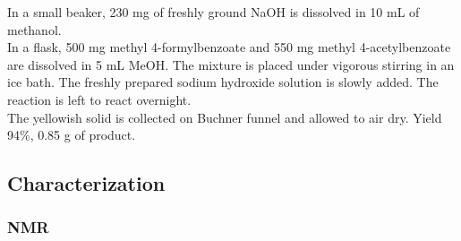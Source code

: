 \documentclass[../Master.tex]{subfiles}
\begin{document}
In a small beaker, 230 mg of freshly ground NaOH is dissolved in 10 mL of methanol. \\
In a flask, 500 mg methyl 4-formylbenzoate and 550 mg methyl 4-acetylbenzoate are dissolved in 5 mL MeOH. The mixture is placed under vigorous stirring in an ice bath. The freshly prepared sodium hydroxide solution is slowly added. The reaction is left to react overnight. \\
The yellowish solid is collected on Buchner funnel and allowed to air dry. Yield 94\%, 0.85 g of product.

\subsection{Characterization}
\subsubsection{NMR}
\end{document}
